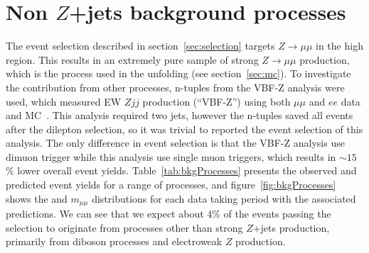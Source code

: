 \section{Non $Z$+jets background processes}
\label{app:bkg-processes}

The event selection described in section~\ref{sec:selection} targets $Z\to\mu\mu$ in the high \pTll{} region. This results in an extremely pure sample of strong $Z\to\mu\mu$ production, which is the process used in the unfolding (see section~\ref{sec:mc}). To investigate the contribution from other processes, n-tuples from the VBF-Z analysis were used, which measured EW $Zjj$ production (``VBF-Z'') using both $\mu\mu$ and $ee$ data and MC~\cite{ATLAS:2020nzk,VBFZsupportNote}. This analysis required two jets, however the n-tuples saved all events after the dilepton selection, so it was trivial to reported the event selection of this analysis. The only difference in event selection is that the VBF-Z analysis use dimuon trigger while this analysis use single muon triggers, which results in $\sim 15$\% lower overall event yields. Table~\ref{tab:bkgProcesses} presents the observed and predicted event yields for a range of processes, and figure~\ref{fig:bkgProcesses} shows the \ptll{} and $m_{\mu\mu}$ distributions for each data taking period with the associated predictions. We can see that we expect about 4\% of the events passing the selection to originate from processes other than strong $Z$+jets production, primarily from diboson processes and electroweak $Z$ production.

